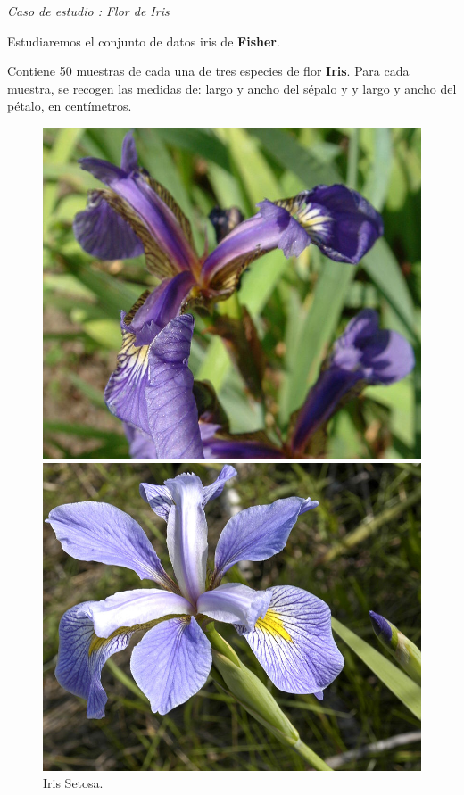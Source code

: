\documentclass[spanish]{beamer}
\begin{document}

\begin{frame}{\textit{Caso de estudio : Flor de Iris}}

Estudiaremos el conjunto de datos iris de \textbf{Fisher}.\break

Contiene 50 muestras de cada una de tres especies de flor \textbf{Iris}. Para cada muestra, se recogen las medidas de: largo y ancho del sépalo y y largo y ancho del pétalo, en centímetros.

\begin{figure}[h]
  \centering
  \begin{minipage}[h]{0.28\textwidth}
    \includegraphics[width=\textwidth]{dani/setosa.jpg}
    \caption{Iris Setosa.}
  \end{minipage}
  \hfill
  \begin{minipage}[h]{0.28\textwidth}
    \includegraphics[width=\textwidth]{dani/virginica.jpg}

\end{minipage}
\end{figure}
\end{frame}
\end{document}
